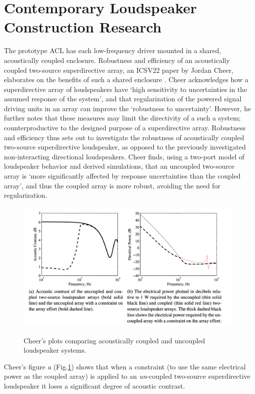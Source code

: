 \documentclass{report}
\begin{document}
    \section{Contemporary Loudspeaker Construction Research}
        The prototype ACL has each low-frequency driver mounted in a shared, acoustically coupled enclosure.
        Robustness and efficiency of an acoustically coupled two-source superdirective array, an ICSV22 paper by Jordan Cheer, elaborates on the benefits of such a shared enclosure \cite{cheer2015robustness}.
        Cheer acknowledges how a superdirective array of loudspeakers have `high sensitivity to uncertainties in the assumed response of the system', and that regularization of the powered signal driving units in an array can improve the `robustness to uncertainty'.
        However, he further notes that these measures may limit the directivity of a such a system; counterproductive to the designed purpose of a superdirective array.
        Robustness and efficiency thus sets out to investigate the robustness of acoustically coupled two-source superdirective loudspeaker, as opposed to the previously investigated non-interacting directional loudspeakers.
        Cheer finds, using a two-port model of loudspeaker behavior and derived simulations, that an uncoupled two-source array is `more significantly affected by response uncertainties than the coupled array', and thus the coupled array is more robust, avoiding the need for regularization.
        \begin{figure}[H]
            \centering
            \includegraphics[scale=0.5]{figs/cheerGraph.png}%
            \caption{Cheer's plots comparing acoustically coupled and uncoupled loudspeaker systems.}\cite{cheer2015robustness}
            \label{cheerGraph}
        \end{figure}
        Cheer's figure \textit{a} (Fig.\ref{cheerGraph}) shows that when a constraint (to use the same electrical power as the coupled array) is applied to an \textit{un}-coupled two-source superdirective loudspeaker it loses a significant degree of acoustic contrast.
\end{document}
